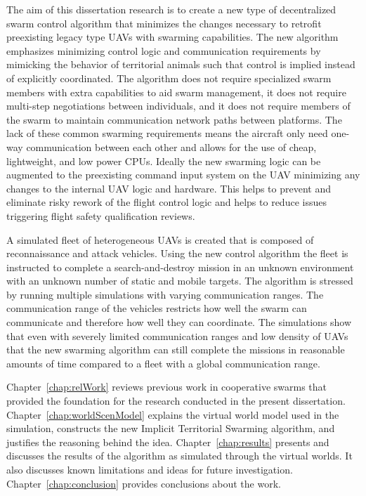 The aim of this dissertation research is to create a new type of decentralized swarm control algorithm that minimizes the changes necessary to retrofit preexisting legacy type UAVs with swarming capabilities.  The new algorithm emphasizes minimizing control logic and communication requirements by mimicking the behavior of territorial animals such that control is implied instead of explicitly coordinated.  The algorithm does not require specialized swarm members with extra capabilities to aid swarm management, it does not require multi-step negotiations between individuals, and it does not require members of the swarm to maintain communication network paths between platforms.  The lack of these common swarming requirements means the aircraft only need one-way communication between each other and allows for the use of cheap, lightweight, and low power CPUs.  Ideally the new swarming logic can be augmented to the preexisting command input system on the UAV minimizing any changes to the internal UAV logic and hardware.  This helps to prevent and eliminate risky rework of the flight control logic and helps to reduce issues triggering flight safety qualification reviews.

A simulated fleet of heterogeneous UAVs is created that is composed of reconnaissance and attack vehicles.  Using the new control algorithm the fleet is instructed to complete a search-and-destroy mission in an unknown environment with an unknown number of static and mobile targets.  The algorithm is stressed by running multiple simulations with varying communication ranges.  The communication range of the vehicles restricts how well the swarm can communicate and therefore how well they can coordinate.  The simulations show that even with severely limited communication ranges and low density of UAVs that the new swarming algorithm can still complete the missions in reasonable amounts of time compared to a fleet with a global communication range.

Chapter~\ref{chap:relWork} reviews previous work in cooperative swarms that provided the foundation for the research conducted in the present dissertation.  Chapter~\ref{chap:worldScenModel} explains the virtual world model used in the simulation, constructs the new Implicit Territorial Swarming algorithm, and justifies the reasoning behind the idea.  Chapter~\ref{chap:results} presents and discusses the results of the algorithm as simulated through the virtual worlds. It also discusses known limitations and ideas for future investigation.  Chapter~\ref{chap:conclusion} provides conclusions about the work.

